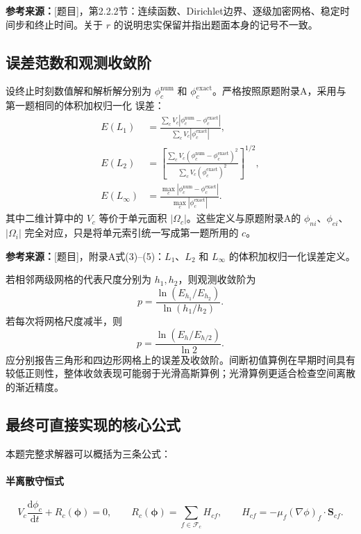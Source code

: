 \documentclass[UTF8,12pt,a4paper]{ctexart}
\numberwithin{equation}{section}
\newcommand{\Task}{\textnormal{[题目]}}
\newcommand{\source}[1]{%
  \par\smallskip
  \noindent\colorbox{sourcebg}{%
    \parbox{0.955\linewidth}{\raggedright\footnotesize\color{sourcegray}\textbf{参考来源：}#1}%
  }
  \par\smallskip
}
\newcommand{\Sf}{\bm S}
\begin{document}
\source{\Task，第2.2.2节：连续函数、Dirichlet边界、逐级加密网格、稳定时间步和终止时间。关于 $r$ 的说明忠实保留并指出题面本身的记号不一致。}

\subsection{误差范数和观测收敛阶}

设终止时刻数值解和解析解分别为 $\phi_c^{\mathrm{num}}$ 和
$\phi_c^{\mathrm{exact}}$。严格按照原题附录A，采用与第一题相同的体积加权归一化
误差：
\begin{align}
  E(L_1)
  &=\frac{\sum_cV_c
  |\phi_c^{\mathrm{num}}-\phi_c^{\mathrm{exact}}|}
  {\sum_cV_c|\phi_c^{\mathrm{exact}}|},
  \label{eq:L1_error}\\
  E(L_2)
  &=\left[
  \frac{\sum_cV_c
  (\phi_c^{\mathrm{num}}-\phi_c^{\mathrm{exact}})^2}
  {\sum_cV_c(\phi_c^{\mathrm{exact}})^2}
  \right]^{1/2},
  \label{eq:L2_error}\\
  E(L_\infty)
  &=\frac{
  \max_c|\phi_c^{\mathrm{num}}-\phi_c^{\mathrm{exact}}|}
  {\max_c|\phi_c^{\mathrm{exact}}|}.
  \label{eq:Linf_error}
\end{align}
其中二维计算中的 $V_c$ 等价于单元面积 $|\Omega_c|$。这些定义与原题附录A的
$\phi_{ni}$、$\phi_{ei}$、$|\Omega_i|$ 完全对应，只是将单元索引统一写成第一题所用的
$c$。

\source{\Task，附录A式(3)--(5)：$L_1$、$L_2$ 和 $L_\infty$ 的体积加权归一化误差定义。}

若相邻两级网格的代表尺度分别为 $h_1,h_2$，则观测收敛阶为
\begin{equation}
  \boxed{
  p=\frac{\ln(E_{h_1}/E_{h_2})}{\ln(h_1/h_2)}}.
  \label{eq:observed_order}
\end{equation}
若每次将网格尺度减半，则
\begin{equation}
  p=\frac{\ln(E_h/E_{h/2})}{\ln2}.
  \label{eq:order_halving}
\end{equation}
应分别报告三角形和四边形网格上的误差及收敛阶。间断初值算例在早期时间具有较低正则性，整体收敛表现可能弱于光滑高斯算例；光滑算例更适合检查空间离散的渐近精度。

\subsection{最终可直接实现的核心公式}

本题完整求解器可以概括为三条公式：

\paragraph{半离散守恒式}
\begin{equation}
  \boxed{
  V_c\frac{\mathrm d\phi_c}{\mathrm dt}
  +R_c(\bm\phi)=0,
  \qquad
  R_c(\bm\phi)=\sum_{f\in\mathcal F_c}H_{cf},
  \qquad
  H_{cf}=-\mu_f(\nabla\phi)_f\cdot\Sf_{cf}}.
  \label{eq:summary_semi}
\end{equation}
\end{document}

